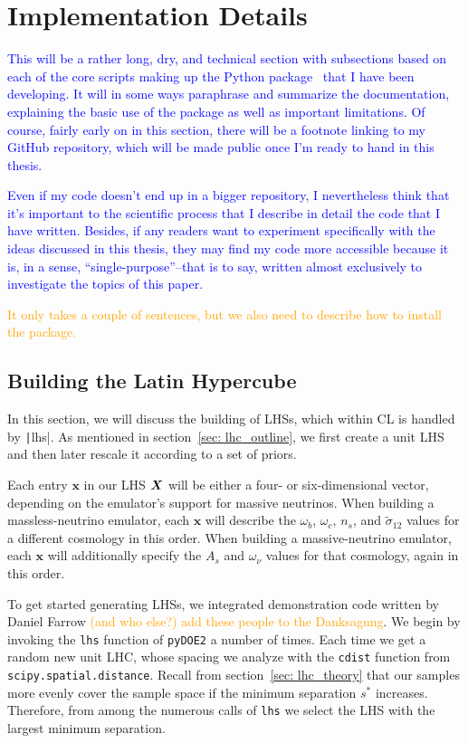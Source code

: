 \chapter{Implementation Details}
\label{chap: implementation}

\textcolor{blue}{This will be a rather long, dry, and technical section with 
subsections based on each of the core scripts making up the Python package \
that I have been developing. It will in some ways paraphrase and summarize the 
documentation, explaining the basic use of the package as well as important 
limitations. Of course, fairly early on in this section, there will be a 
footnote linking to my GitHub repository, which will be made public once I'm 
ready to hand in this thesis.}

\textcolor{blue}{Even if my code doesn't end up in a bigger repository, I 
nevertheless think that it's important to the scientific process that I 
describe in detail the code that I have written. Besides, if any readers want 
to experiment specifically with the ideas discussed in this thesis, they may 
find my code more accessible because it is, in a sense, ``single-purpose''--that 
is to say, written almost exclusively to investigate the topics of this 
paper.}

\textcolor{orange}{It only takes a couple of sentences, but we also need to 
describe how to install the package.}

\section{Building the Latin Hypercube}
\label{sec: build_lhc}


In this section, we will discuss the building of LHSs, which within CL is 
handled by \texttt|lhs|. As mentioned in section~\ref{sec: lhc_outline},
we first create a unit LHS and then later rescale it according to a set of
priors.

Each entry $\bm{x}$ in our LHS $\bm{X}$ will be either a four- or
six-dimensional vector, 
depending on the emulator's support for massive neutrinos. When building a
massless-neutrino emulator, each $\bm{x}$ will describe the $\omega_b$,
$\omega_c$, $n_s$, and
$\tilde{\sigma}_{12}$ values for a different cosmology in 
this order. When building a massive-neutrino emulator, each $\bm{x}$ will 
additionally specify the $A_s$ and $\omega_\nu$ values for that cosmology, 
again in this order.

To get started generating LHSs, we integrated demonstration code written by 
Daniel Farrow \textcolor{orange}{(and who else?) add these people to the 
Danksagung}. We begin by invoking the \texttt{lhs} function of
\texttt{pyDOE2} a number of times. Each time we get a random new unit LHC, 
whose spacing we analyze with the \texttt{cdist} function from
\texttt{scipy.spatial.distance}.
Recall from section~\ref{sec: lhc_theory} that
our samples more evenly cover the sample space if the minimum separation
$s^*$ increases. Therefore, from among the numerous calls of \texttt{lhs} we 
select the LHS with the largest minimum separation.


